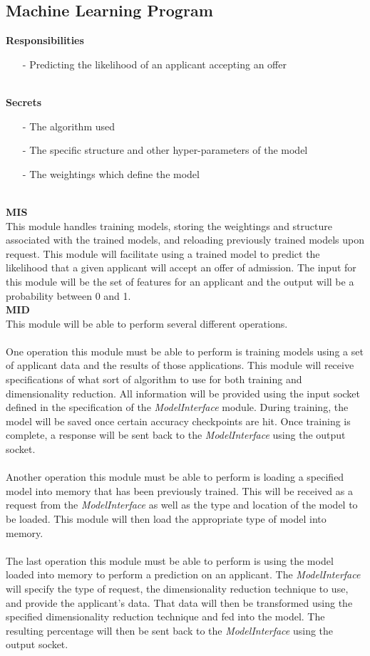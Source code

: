 \documentclass[titlepage]{article}
\begin{document}
\subsection{Machine Learning Program}
\textbf{Responsibilities}
\begin{itemize}
	\item[-] Predicting the likelihood of an applicant accepting an offer
\end{itemize}~\\
\textbf{Secrets}
\begin{itemize}
	\item[-] The algorithm used
	\item[-] The specific structure and other hyper-parameters of the model
	\item[-] The weightings which define the model
\end{itemize}~\\
\textbf{MIS}\\[2mm]
This module handles training models, storing the weightings and structure associated with the trained models, and reloading previously trained models upon request. This module will facilitate using a trained model to predict the likelihood that a given applicant will accept an offer of admission. The input for this module will be the set of features for an applicant and the output will be a probability between 0 and 1.\\[6mm]
\textbf{MID}\\[2mm]
This module will be able to perform several different operations.\\~\\
One operation this module must be able to perform is training models using a set of applicant data and the results of those applications. This module will receive specifications of what sort of algorithm to use for both training and dimensionality reduction. All information will be provided using the input socket defined in the specification of the \hbox{\textit{ModelInterface}} module. During training, the model will be saved once certain accuracy checkpoints are hit. Once training is complete, a response will be sent back to the \textit{ModelInterface} using the output socket.\\~\\
Another operation this module must be able to perform is loading a specified model into memory that has been previously trained. This will be received as a request from the \textit{ModelInterface} as well as the type and location of the model to be loaded. This module will then load the appropriate type of model into memory.\\~\\
The last operation this module must be able to perform is using the model loaded into memory to perform a prediction on an applicant. The \textit{ModelInterface} will specify the type of request, the dimensionality reduction technique to use, and provide the applicant's data. That data will then be transformed using the specified dimensionality reduction technique and fed into the model. The resulting percentage will then be sent back to the \textit{ModelInterface} using the output socket.\\[6mm]
\end{document}
